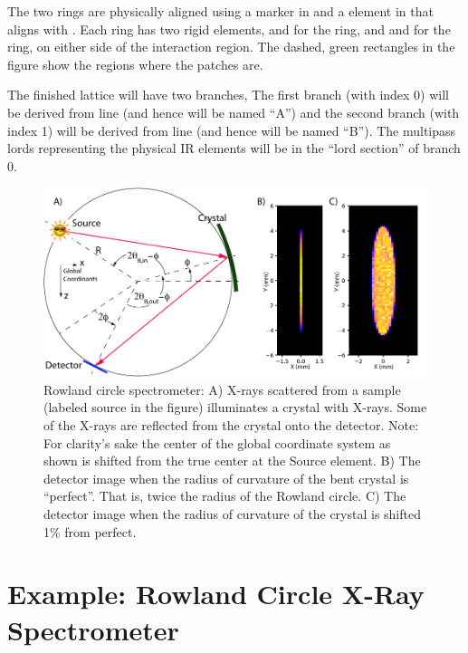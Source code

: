 The two rings are physically aligned using a marker  in 
and a  element  in  that aligns with
.  Each ring has two rigid  elements,  and  for the 
ring, and  and  for the  ring, on either side of the interaction region.
The dashed, green rectangles in the figure show the regions where the patches are.

The finished lattice will have two branches, The first branch (with
index 0) will be derived from line  (and hence will be named
``A'') and the second branch (with index 1) will be derived from line
 (and hence will be named ``B''). The multipass lords
representing the physical IR elements will be in the ``lord section''
of branch 0.



\begin{figure}[tb]
  \centering
  \includegraphics[width=5in]{rowland-circle.pdf}
  \caption[Rowland circle spectrometer]
  {
Rowland circle spectrometer: A) X-rays scattered from a sample (labeled source in the figure)
illuminates a crystal with X-rays. Some of the X-rays are reflected from the crystal onto the
detector. Note: For clarity's sake the center of the global coordinate system as shown is shifted
from the true center at the Source element. B) The detector image when the radius of curvature of
the bent crystal is ``perfect''. That is, twice the radius of the Rowland circle. C) The detector
image when the radius of curvature of the crystal is shifted 1\% from perfect.
  }
  \label{f:rowland}
\end{figure}

\section{Example: Rowland Circle X-Ray Spectrometer}
\label{s:rowland}

